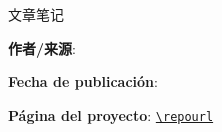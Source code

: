 
\begin{titlepage}
\centering
{\Large 文章笔记\par}
\vspace{1.2cm}
{\huge\bfseries \notetitle\par}
\vspace{0.8cm}
{\large \noteauthors\par}
\vspace{0.3cm}
{\large \notedate\par}
\vspace{1.2cm}

\vfill
\begin{tcolorbox}[width=0.9\textwidth, colback=black!2!white, colframe=black!60, sharp corners]
\textbf{作者/来源}: \videochannel\par
\textbf{Fecha de publicación}: \videopublishdate\par
{}
\par
\textbf{Página del proyecto}: \href{\repourl}{\nolinkurl{\repourl}}\par
\end{tcolorbox}
\end{titlepage}

\tableofcontents
\newpage



